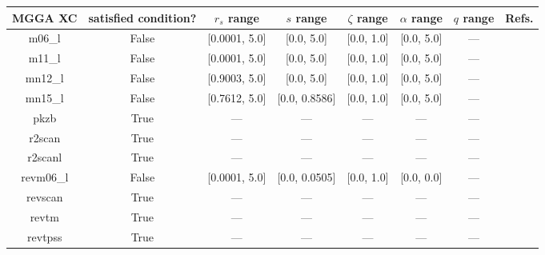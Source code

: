 \begin{tabular}{|c|c|c|c|c|c|c|l|}
\hline
  MGGA XC &  satisfied condition? &   $r_s$ range &     $s$ range & $\zeta$ range & $\alpha$ range & $q$ range  &                                                     Refs. \\ \hline
   m06\_l &                 False & [0.0001, 5.0] &    [0.0, 5.0] &    [0.0, 1.0] &     [0.0, 5.0] &        --- &                       \cite{Zhao2006_194101,Zhao2008_215} \\ \hline
   m11\_l &                 False & [0.0001, 5.0] &    [0.0, 5.0] &    [0.0, 1.0] &     [0.0, 5.0] &        --- &                                   \cite{Peverati2012_117} \\ \hline
  mn12\_l &                 False & [0.9003, 5.0] &    [0.0, 5.0] &    [0.0, 1.0] &     [0.0, 5.0] &        --- &                                 \cite{Peverati2012_13171} \\ \hline
  mn15\_l &                 False & [0.7612, 5.0] & [0.0, 0.8586] &    [0.0, 1.0] &     [0.0, 5.0] &        --- &                                        \cite{Yu2016_1280} \\ \hline
     pkzb &                  True &           --- &           --- &           --- &            --- &        --- &                                    \cite{Perdew1999_2544} \\ \hline
   r2scan &                  True &           --- &           --- &           --- &            --- &        --- &                  \cite{Furness2020_8208,Furness2020_9248} \\ \hline
  r2scanl &                  True &           --- &           --- &           --- &            --- &        --- & \cite{Mejia2020_121109,Furness2020_8208,Furness2020_9248} \\ \hline
revm06\_l &                 False & [0.0001, 5.0] & [0.0, 0.0505] &    [0.0, 1.0] &     [0.0, 0.0] &        --- &                                      \cite{Wang2017_8487} \\ \hline
  revscan &                  True &           --- &           --- &           --- &            --- &        --- &                                     \cite{Mezei2018_2469} \\ \hline
    revtm &                  True &           --- &           --- &           --- &            --- &        --- &                                      \cite{Jana2019_6356} \\ \hline
  revtpss &                  True &           --- &           --- &           --- &            --- &        --- &            \cite{Perdew2009_026403,Perdew2009_026403_err} \\ \hline

\end{tabular}
